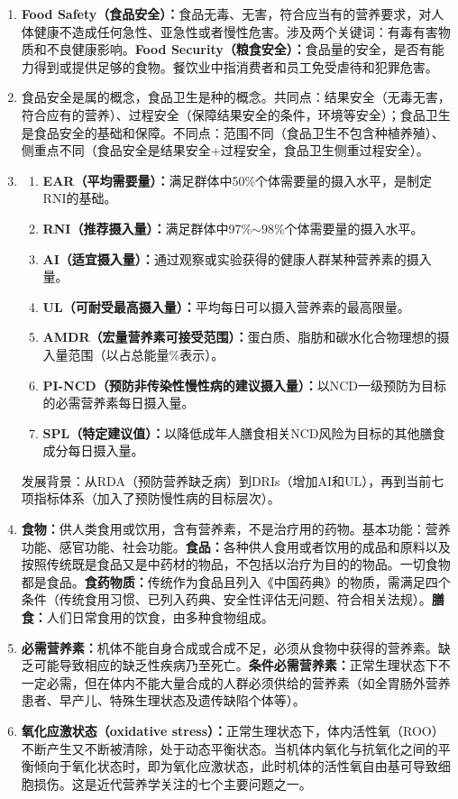 {\begin{enumerate}[leftmargin=*, itemsep=5pt]
    \item \textbf{Food Safety（食品安全）：}食品无毒、无害，符合应当有的营养要求，对人体健康不造成任何急性、亚急性或者慢性危害。涉及两个关键词：有毒有害物质和不良健康影响。\textbf{Food Security（粮食安全）：}食品量的安全，是否有能力得到或提供足够的食物。餐饮业中指消费者和员工免受虐待和犯罪危害。
    \item 食品安全是属的概念，食品卫生是种的概念。共同点：结果安全（无毒无害，符合应有的营养）、过程安全（保障结果安全的条件，环境等安全）；食品卫生是食品安全的基础和保障。不同点：范围不同（食品卫生不包含种植养殖）、侧重点不同（食品安全是结果安全+过程安全，食品卫生侧重过程安全）。
    \item \begin{enumerate}[leftmargin=*, itemsep=2pt]
        \item \textbf{EAR（平均需要量）：}满足群体中50\%个体需要量的摄入水平，是制定RNI的基础。
        \item \textbf{RNI（推荐摄入量）：}满足群体中97\%$\sim$98\%个体需要量的摄入水平。
        \item \textbf{AI（适宜摄入量）：}通过观察或实验获得的健康人群某种营养素的摄入量。
        \item \textbf{UL（可耐受最高摄入量）：}平均每日可以摄入营养素的最高限量。
        \item \textbf{AMDR（宏量营养素可接受范围）：}蛋白质、脂肪和碳水化合物理想的摄入量范围（以占总能量\%表示）。
        \item \textbf{PI-NCD（预防非传染性慢性病的建议摄入量）：}以NCD一级预防为目标的必需营养素每日摄入量。
        \item \textbf{SPL（特定建议值）：}以降低成年人膳食相关NCD风险为目标的其他膳食成分每日摄入量。
    \end{enumerate}
    发展背景：从RDA（预防营养缺乏病）到DRIs（增加AI和UL），再到当前七项指标体系（加入了预防慢性病的目标层次）。
    \item \textbf{食物：}供人类食用或饮用，含有营养素，不是治疗用的药物。基本功能：营养功能、感官功能、社会功能。\textbf{食品：}各种供人食用或者饮用的成品和原料以及按照传统既是食品又是中药材的物品，不包括以治疗为目的的物品。一切食物都是食品。\textbf{食药物质：}传统作为食品且列入《中国药典》的物质，需满足四个条件（传统食用习惯、已列入药典、安全性评估无问题、符合相关法规）。\textbf{膳食：}人们日常食用的饮食，由多种食物组成。
    \item \textbf{必需营养素：}机体不能自身合成或合成不足，必须从食物中获得的营养素。缺乏可能导致相应的缺乏性疾病乃至死亡。\textbf{条件必需营养素：}正常生理状态下不一定必需，但在体内不能大量合成的人群必须供给的营养素（如全胃肠外营养患者、早产儿、特殊生理状态及遗传缺陷个体等）。
    \item \textbf{氧化应激状态（oxidative stress）：}正常生理状态下，体内活性氧（ROO）不断产生又不断被清除，处于动态平衡状态。当机体内氧化与抗氧化之间的平衡倾向于氧化状态时，即为氧化应激状态，此时机体的活性氧自由基可导致细胞损伤。这是近代营养学关注的七个主要问题之一。
\end{enumerate}

\newpage
}
